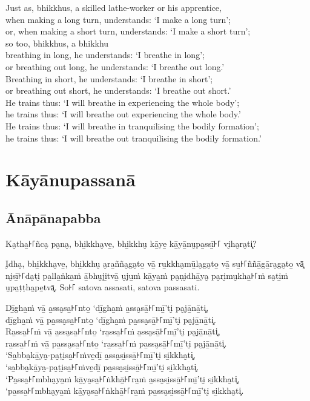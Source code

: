 Just as, bhikkhus, a skilled lathe-worker or his apprentice,\\
when making a long turn, understands: ‘I make a long turn’;\\
or, when making a short turn, understands: ‘I make a short turn’;\\
so too, bhikkhus, a bhikkhu\\
breathing in long, he understands: ‘I breathe in long’;\\
or breathing out long, he understands: ‘I breathe out long.’\\
Breathing in short, he understands: ‘I breathe in short’;\\
or breathing out short, he understands: ‘I breathe out short.’\\
He trains thus: ‘I will breathe in experiencing the whole body’;\\
he trains thus: ‘I will breathe out experiencing the whole body.’\\
He trains thus: ‘I will breathe in tranquilising the bodily formation’;\\
he trains thus: ‘I will breathe out tranquilising the bodily formation.’

\paliPage
\chapter*{Kāyānupassanā}

\section*{Ānāpānapabba}

Ka̮tha̱꜔꜒ñca̮ pa̮na̮, bhi̱kkha̮ve̱, bhi̱kkhu̮ kā̱ye̱ kā̱yā̱nu̮pa̱ssī̱꜔꜒ vi̮ha̮ra̮ti͓?

I̮dha̮, bhi̱kkha̮ve̱, bhi̱kkhu̮ a̮ra̱ñña̮ga̮to̱ vā̱ ru̱kkha̮mū̱la̮ga̮to̱ vā̱ su̱꜔꜒ññā̱gā̱ra̮ga̮to̱ vā͓
ni̮sī̱꜔꜒da̮ti̮ pa̱lla̱ṅka̱ṁ ā̱bhu̮ji̱tvā̱ u̮ju̱ṁ kā̱ya̱ṁ pa̮ṇi̮dhā̱ya̮ pa̮ri̮mu̮kha̱꜔꜒ṁ sa̮ti̱ṁ u̮pa̱ṭṭha̮pe̱tvā͓.
So꜔꜒ satova assasati, satova passasati.

Dī̱gha̱ṁ vā̱ a̱ssa̮sa̱꜔꜒nto̱ ‘dī̱gha̱ṁ a̱ssa̮sā̱꜔꜒mī̱’ti̮ pa̮jā̱nā̱ti͓,\\
dī̱gha̱ṁ vā̱ pa̱ssa̮sa̱꜔꜒nto̱ ‘dī̱gha̱ṁ pa̱ssa̮sā̱꜔꜒mī̱’ti̮ pa̮jā̱nā̱ti͓.\\
Ra̱ssa̱꜔꜒ṁ vā̱ a̱ssa̮sa̱꜔꜒nto̱ ‘ra̱ssa̱꜔꜒ṁ a̱ssa̮sā̱꜔꜒mī̱’ti̮ pa̮jā̱nā̱ti͓,\\
ra̱ssa̱꜔꜒ṁ vā̱ pa̱ssa̮sa̱꜔꜒nto̱ ‘ra̱ssa̱꜔꜒ṁ pa̱ssa̮sā̱꜔꜒mī̱’ti̮ pa̮jā̱nā̱ti͓.\\
‘Sa̱bba̮kā̱ya̮-pa̮ṭi̮sa̱꜔꜒ṁve̱dī̱ a̱ssa̮si̱ssā̱꜔꜒mī̱’ti̮ si̱kkha̮ti͓,\\
‘sa̱bba̮kā̱ya̮-pa̮ṭi̮sa̱꜔꜒ṁve̱dī̱ pa̱ssa̮si̱ssā̱꜔꜒mī̱’ti̮ si̱kkha̮ti͓.\\
‘Pa̱ssa̱꜔꜒mbha̮ya̱ṁ kā̱ya̮sa̱꜔꜒ṅkhā̱꜔꜒ra̱ṁ a̱ssa̮si̱ssā̱꜔꜒mī̱’ti̮ si̱kkha̮ti͓,\\
‘pa̱ssa̱꜔꜒mbha̮ya̱ṁ kā̱ya̮sa̱꜔꜒ṅkhā̱꜔꜒ra̱ṁ pa̱ssa̮si̱ssā̱꜔꜒mī̱’ti̮ si̱kkha̮ti͓.

